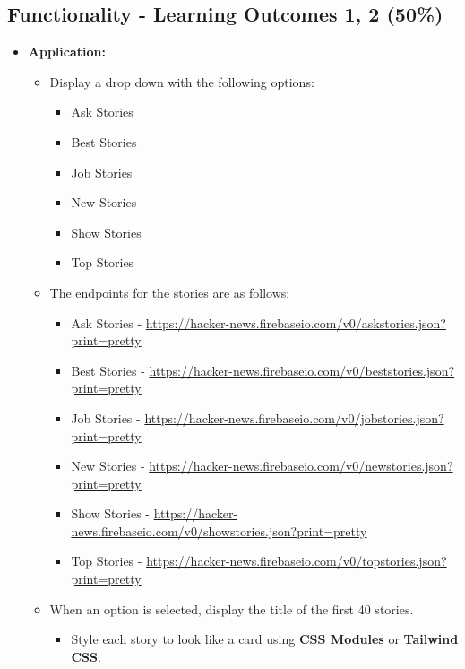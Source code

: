 \documentclass{article}
\begin{document}
\subsection*{Functionality - Learning Outcomes 1, 2 (50\%)}
\begin{itemize}
	\item \textbf{Application:}
\begin{itemize}
	\item Display a drop down with the following options:
	\begin{itemize}
		\item Ask Stories
		\item Best Stories
		\item Job Stories
		\item New Stories
		\item Show Stories
		\item Top Stories
	\end{itemize}
	\item The endpoints for the stories are as follows:
	\begin{itemize}
		\item Ask Stories - \href{https://hacker-news.firebaseio.com/v0/askstories.json?print=pretty}{https://hacker-news.firebaseio.com/v0/askstories.json?print=pretty}
		\item Best Stories - \href{https://hacker-news.firebaseio.com/v0/beststories.json?print=pretty}{https://hacker-news.firebaseio.com/v0/beststories.json?print=pretty}
		\item Job Stories - \href{https://hacker-news.firebaseio.com/v0/jobstories.json?print=pretty}{https://hacker-news.firebaseio.com/v0/jobstories.json?print=pretty}
		\item New Stories - \href{https://hacker-news.firebaseio.com/v0/newstories.json?print=pretty}{https://hacker-news.firebaseio.com/v0/newstories.json?print=pretty}
		\item Show Stories - \href{https://hacker-news.firebaseio.com/v0/showstories.json?print=pretty}{https://hacker-news.firebaseio.com/v0/showstories.json?print=pretty}
		\item Top Stories - \href{https://hacker-news.firebaseio.com/v0/topstories.json?print=pretty}{https://hacker-news.firebaseio.com/v0/topstories.json?print=pretty}
	\end{itemize}
	\item When an option is selected, display the title of the first 40 stories.
	\begin{itemize}
		\item Style each story to look like a card using \textbf{CSS Modules} or \textbf{Tailwind CSS}.

\end{itemize}
\end{itemize}
\end{itemize}
\end{document}
